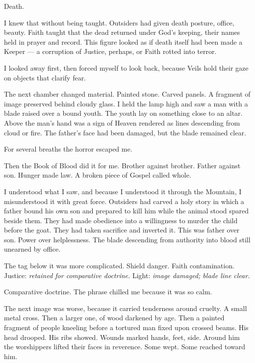 Death.\par

I knew that without being taught. Outsiders had given death posture, office, beauty. Faith taught that the dead returned under God's keeping, their names held in prayer and record. This figure looked as if death itself had been made a Keeper --- a corruption of Justice, perhaps, or Faith rotted into terror.\par

I looked away first, then forced myself to look back, because Veils hold their gaze on objects that clarify fear.\par

The next chamber changed material. Painted stone. Carved panels. A fragment of image preserved behind cloudy glass. I held the lamp high and saw a man with a blade raised over a bound youth. The youth lay on something close to an altar. Above the man's hand was a sign of Heaven rendered as lines descending from cloud or fire. The father's face had been damaged, but the blade remained clear.\par

For several breaths the horror escaped me.\par

Then the Book of Blood did it for me. Brother against brother. Father against son. Hunger made law. A broken piece of Gospel called whole.\par

I understood what I saw, and because I understood it through the Mountain, I misunderstood it with great force. Outsiders had carved a holy story in which a father bound his own son and prepared to kill him while the animal stood spared beside them. They had made obedience into a willingness to murder the child before the goat. They had taken sacrifice and inverted it. This was father over son. Power over helplessness. The blade descending from authority into blood still unearned by office.\par

The tag below it was more complicated. Shield danger. Faith contamination. Justice: \textit{retained for comparative doctrine.} Light: \textit{image damaged; blade line clear.}\par

Comparative doctrine. The phrase chilled me because it was so calm.\par

The next image was worse, because it carried tenderness around cruelty. A small metal cross. Then a larger one, of wood darkened by age. Then a painted fragment of people kneeling before a tortured man fixed upon crossed beams. His head drooped. His ribs showed. Wounds marked hands, feet, side. Around him the worshippers lifted their faces in reverence. Some wept. Some reached toward him.\par

